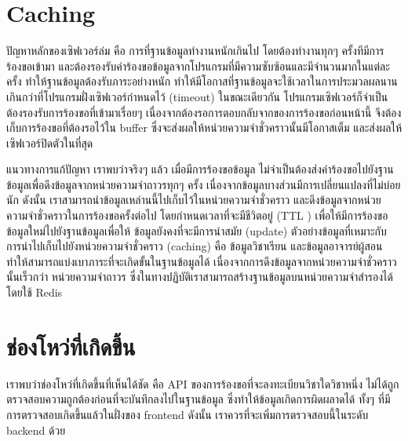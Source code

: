 \section{Caching}

ปัญหาหลักของเซิฟเวอร์ล่ม คือ การที่ฐานข้อมูลทำงานหนักเกินไป โดยต้องทำงานทุกๆ ครั้งทีมีการร้องขอเข้ามา และต้องรองรับคำร้องขอข้อมูลจากโปรแกรมที่มีความซับซ้อนและมีจำนวนมากในแต่ละครั้ง ทำให้ฐานข้อมูลต้องรับภาระอย่างหนัก 
ทำให้มีโอกาสที่ฐานข้อมูลจะใช้เวลาในการประมวลผลนานเกินกว่าที่โปรแกรมฝั่งเซิฟเวอร์กำหนดไว้ (timeout) ในขณะเดียวกัน โปรแกรมเซิฟเวอร์ก็จำเป็นต้องรองรับการร้องขอที่เข้ามาเรื่อยๆ เนื่องจากต้องรอการตอบกลับจากของการร้องขอก่อนหน้านี้ จึงต้องเก็บการร้องขอที่ต้องรอไว้ใน buffer ซึ่งจะส่งผลให้หน่วยความจำชั่วคราวนั้นมีโอกาสเต็ม และส่งผลให้เซิฟเวอร์ปิดตัวในที่สุด

แนวทางการแก้ปัญหา เราพบว่าจริงๆ แล้ว เมื่อมีการร้องขอข้อมูล ไม่จำเป็นต้องส่งคำร้องขอไปยังฐานข้อมูลเพื่อดึงข้อมูลจากหน่วยความจำถาวรทุกๆ ครั้ง เนื่องจากข้อมูลบางส่วนมีการเปลี่ยนแปลงที่ไม่บ่อยนัก ดังนั้น เราสามารถนำข้อมูลเหล่านนี้ไปเก็บไว้ในหน่วยความจำชั่วคราว และดึงข้อมูลจากหน่วยความจำชั่วคราวในการร้องขอครั้งต่อไป โดยกำหนดเวลาที่จะมีชีวิตอยู่ (TTL \cite{ttl}) เพื่อให้มีการร้องขอข้อมูลใหม่ไปยังฐานข้อมูลเพื่อให้ ข้อมูลยังคงที่จะมีการนำสมัย (update) ตัวอย่างข้อมูลที่เหมาะกับการนำไปเก็บไปยังหน่วยความจำชั่วคราว (caching) คือ ข้อมูลวิชาเรียน และข้อมูลอาจารย์ผู้สอน ทำให้สามารถแบ่งเบาภาระที่จะเกิดขั้นในฐานข้อมูลได้ เนื่องจากการดึงข้อมูลจากหน่วยความจำชั่วคราวนั้นเร็วกว่า หน่วยความจำถาวร ซึ่งในทางปฏิบัติเราสามารถสร้างฐานข้อมูลบนหน่วยความจำสำรองได้โดยใช้ Redis \cite{redis}

\section{ช่องโหว่ที่เกิดขึ้น}

เราพบว่าช่องโหว่ที่เกิดขึ้นที่เห็นได้ชัด คือ API ของการร้องขอที่จะลงทะเบียนวิชาใดวิชาหนึ่ง ไม่ได้ถูกตรวจสอบความถูกต้องก่อนที่จะบันทึกลงไปในฐานข้อมูล ซึ่งทำให้ข้อมูลเกิดการผิดผลาดได้ ทั้งๆ ที่มีการตรวจสอบเกิดขึ้นแล้วในฝั่งของ frontend
ดังนั้น เราควรที่จะเพิ่มการตรวจสอบนี้ในระดับ backend ด้วย
